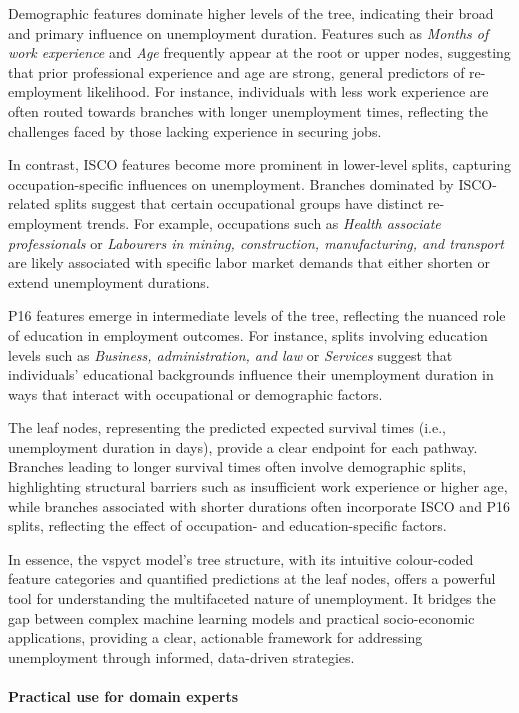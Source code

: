 \documentclass[3p,review,authoryear]{elsarticle}
\begin{document}
Demographic features dominate higher levels of the tree, indicating their broad and primary influence on unemployment duration.
Features such as \textit{Months of work experience} and \textit{Age} frequently appear at the root or upper nodes, suggesting that prior professional experience and age are strong, general predictors of re-employment likelihood.
For instance, individuals with less work experience are often routed towards branches with longer unemployment times, reflecting the challenges faced by those lacking experience in securing jobs.

In contrast, ISCO features become more prominent in lower-level splits, capturing occupation-specific influences on unemployment.
Branches dominated by ISCO-related splits suggest that certain occupational groups have distinct re-employment trends.
For example, occupations such as \textit{Health associate professionals} or \textit{Labourers in mining, construction, manufacturing, and transport} are likely associated with specific labor market demands that either shorten or extend unemployment durations.

P16 features emerge in intermediate levels of the tree, reflecting the nuanced role of education in employment outcomes.
For instance, splits involving education levels such as \textit{Business, administration, and law} or \textit{Services} suggest that individuals’ educational backgrounds influence their unemployment duration in ways that interact with occupational or demographic factors.

The leaf nodes, representing the predicted expected survival times (i.e., unemployment duration in days), provide a clear endpoint for each pathway.
Branches leading to longer survival times often involve demographic splits, highlighting structural barriers such as insufficient work experience or higher age, while branches associated with shorter durations often incorporate ISCO and P16 splits, reflecting the effect of occupation- and education-specific factors.

In essence, the \gls{vspyct} model's tree structure, with its intuitive colour-coded feature categories and quantified predictions at the leaf nodes, offers a powerful tool for understanding the multifaceted nature of unemployment.
It bridges the gap between complex machine learning models and practical socio-economic applications, providing a clear, actionable framework for addressing unemployment through informed, data-driven strategies.

\paragraph{Practical use for domain experts}
\end{document}
